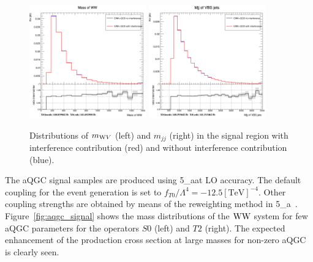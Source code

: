 \begin{figure}[!htbp]
\centering
\includegraphics[width=0.45\textwidth]{Plots/plots/interference_comparison_mww.png}
\includegraphics[width=0.45\textwidth]{Plots/plots/interference_comparison_mjj_vbs.png}
\caption{Distributions of $m_{\mathrm{W} V}$ (left) and $m_{jj}$ (right) in the signal region with interference contribution (red) and without interference contribution (blue).}
\label{fig:interference}
\end{figure}

The aQGC signal samples are produced using \MADGRAPH{}5\_a\MCATNLO at LO accuracy. The default coupling for the event generation is set to $f_{T0} / \Lambda^{4} = -12.5 [\mathrm{TeV}]^{-4}$. Other coupling strengths are obtained by means of the reweighting method in \MADGRAPH{}5\_a\MCATNLO~\cite{Mattelaer2016,Mattelaer-reweight}. Figure~\ref{fig:aqgc_signal} shows the mass distributions of the  $\mathrm{W} \mathrm{W}$ system for few aQGC parameters for the operators $S0$ (left) and $T2$ (right). The expected enhancement of the production cross section at large masses for non-zero aQGC is clearly seen.      
  
